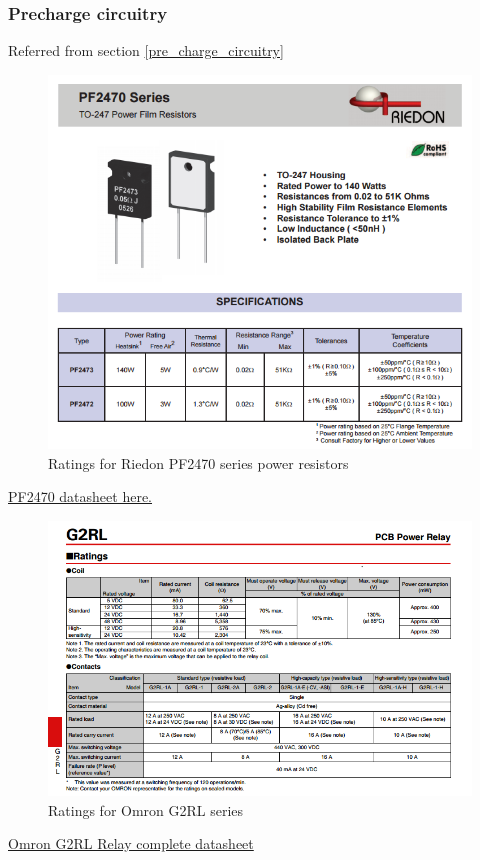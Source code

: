 \documentclass{article}
\begin{document}
\setcounter{subsubsection}{8}
\subsubsection{Precharge circuitry}\label{appendix_precharge}
Referred from section \ref{pre_charge_circuitry}

\begin{figure}[H]
    \centering
    \includegraphics[width=\linewidth]{PF2470_datasheet.png}
    \caption{Ratings for Riedon PF2470 series power resistors}
\end{figure}
\href{http://riedon.com/media/pdf/PF2470.pdf}{PF2470 datasheet here.}

\begin{figure}[H]
    \centering
    \includegraphics[width=\linewidth]{G2RL_datasheet.png}
    \caption{Ratings for Omron G2RL series}
\end{figure}
\href{http://www.mouser.com/ds/2/307/en-g2rl-472571.pdf}{Omron G2RL Relay complete datasheet}
\end{document}
